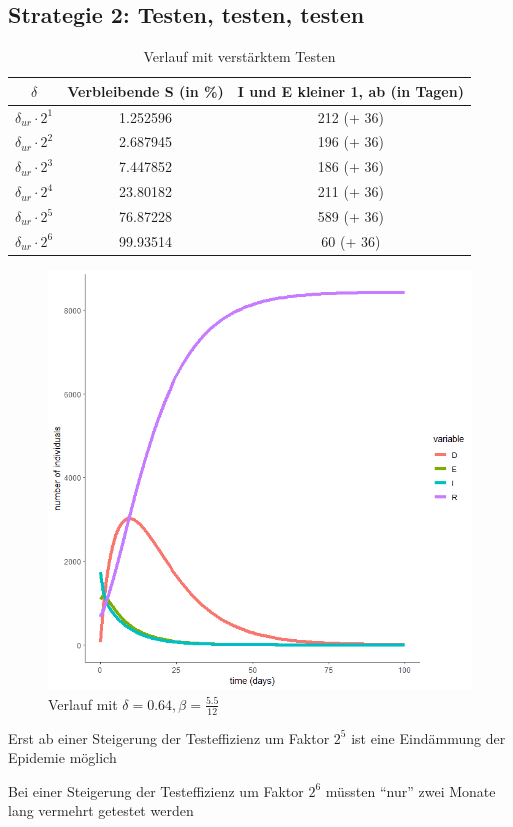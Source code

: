 \documentclass{scrartcl}
\begin{document}
\subsection{Strategie 2: Testen, testen, testen}
	\begin{table}[h]
		\caption{Verlauf mit verstärktem Testen}
		\centering
		\begin{tabular}{@{}ccc@{}}
			\toprule
			$\delta$ & Verbleibende S (in \%) & I und E kleiner 1, ab (in Tagen)\\ 
			\midrule
			 $\delta_{ur} \cdot 2^1$ & 1.252596 & 212 (+ 36) \\ 
			 $\delta_{ur} \cdot 2^2$ & 2.687945 & 196 (+ 36)\\  
			 $\delta_{ur} \cdot 2^3$ & 7.447852 & 186 (+ 36)\\ 
			 $\delta_{ur} \cdot 2^4$ & 23.80182 & 211 (+ 36)\\ 
			 $\delta_{ur} \cdot 2^5$ & 76.87228 & 589 (+ 36)\\ 
			 $\delta_{ur} \cdot 2^6$ & 99.93514 & 60 (+ 36)\\ 
			\bottomrule
		\end{tabular}
	\end{table}
	\begin{figure}[h]
        	\centering
		\includegraphics[scale=0.5]{delta=0,64,beta_unveraendert,ohne_s.png}
		\caption{Verlauf mit $\delta = 0.64, \beta = \frac{5.5}{12}$}
	\end{figure}	
	\begin{arrowlist}
		\item Erst ab einer Steigerung der Testeffizienz um Faktor $2^5$ ist eine Eindämmung der Epidemie möglich
		\item Bei einer Steigerung der Testeffizienz um Faktor $2^6$ müssten \enquote{nur} zwei Monate lang vermehrt getestet werden
	\end{arrowlist}
\end{document}
